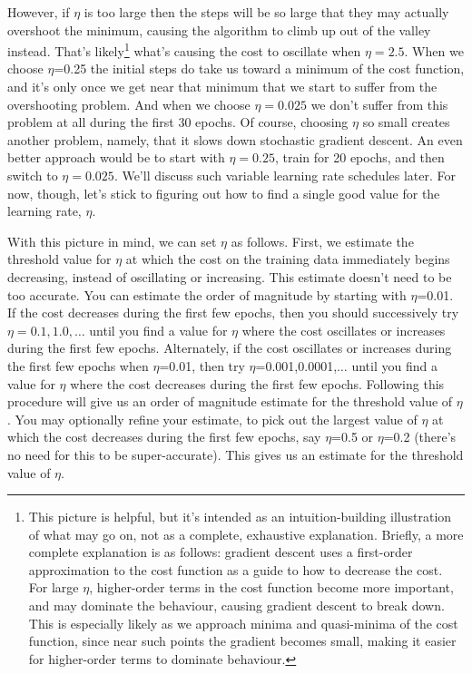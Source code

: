 \documentclass[a4paper,twoside,10pt]{book}
\begin{document}
However, if $\eta$ is too large then the steps will be so large that they may actually overshoot the minimum, causing the algorithm to climb up out of the valley instead. That's likely\footnote{This picture is helpful, but it's intended as an intuition-building illustration of what may go on, not as a complete, exhaustive explanation. Briefly, a more complete explanation is as follows: gradient descent uses a first-order approximation to the cost function as a guide to how to decrease the cost. For large $\eta$, higher-order terms in the cost function become more important, and may dominate the behaviour, causing gradient descent to break down. This is especially likely as we approach minima and quasi-minima of the cost function, since near such points the gradient becomes small, making it easier for higher-order terms to dominate behaviour.} what's causing the cost to oscillate when $\eta=2.5$. When we choose $\eta$=0.25 the initial steps do take us toward a minimum of the cost function, and it's only once we get near that minimum that we start to suffer from the overshooting problem. And when we choose $\eta=0.025$ we don't suffer from this problem at all during the first 30 epochs. Of course, choosing $\eta$ so small creates another problem, namely, that it slows down stochastic gradient descent. An even better approach would be to start with $\eta=0.25$, train for 20 epochs, and then switch to $\eta=0.025$. We'll discuss such variable learning rate schedules later. For now, though, let's stick to figuring out how to find a single good value for the learning rate, $\eta$.

With this picture in mind, we can set $\eta$ as follows. First, we estimate the threshold value for $\eta$ at which the cost on the training data immediately begins decreasing, instead of oscillating or increasing. This estimate doesn't need to be too accurate. You can estimate the order of magnitude by starting with $\eta$=0.01. If the cost decreases during the first few epochs, then you should successively try $\eta=0.1,1.0,\ldots$ until you find a value for $\eta$ where the cost oscillates or increases during the first few epochs. Alternately, if the cost oscillates or increases during the first few epochs when $\eta$=0.01, then try $\eta$=0.001,0.0001,$\ldots$ until you find a value for $\eta$ where the cost decreases during the first few epochs. Following this procedure will give us an order of magnitude estimate for the threshold value of $\eta$. You may optionally refine your estimate, to pick out the largest value of $\eta$ at which the cost decreases during the first few epochs, say $\eta$=0.5 or $\eta$=0.2 (there's no need for this to be super-accurate). This gives us an estimate for the threshold value of $\eta$.
\end{document}
